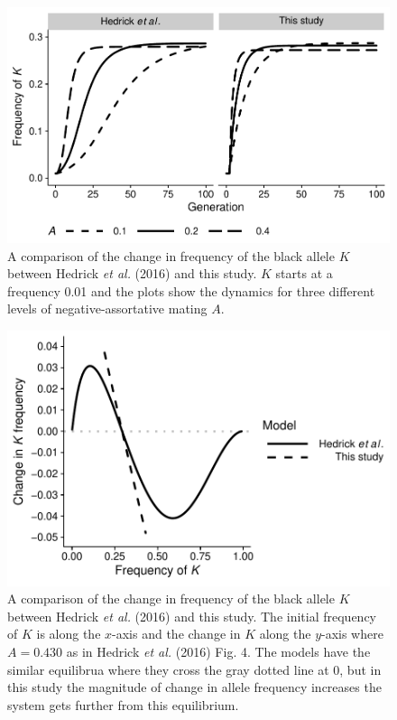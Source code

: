 \documentclass[
]{article}
\begin{document}
\begin{figure}[ht]
  \centering
  \includegraphics[width=\textwidth]{../figures/fig3.pdf}
  \caption{A comparison of the change in frequency of the black allele $K$ between Hedrick \textit{et al.} (2016) and this study. $K$ starts at a frequency 0.01 and the plots show the dynamics for three different levels of negative-assortative mating $A$.}
  \label{fig:fig3}
\end{figure}

\begin{figure}[ht]
  \centering
  \includegraphics[width=\textwidth]{../figures/fig4.pdf}
  \caption{A comparison of the change in frequency of the black allele $K$ between Hedrick \textit{et al.} (2016) and this study. The initial frequency of $K$ is along the $x$-axis and the change in $K$ along the $y$-axis where $A = 0.430$ as in Hedrick \textit{et al.} (2016) Fig. 4. The models have the similar equilibrua where they cross the gray dotted line at 0, but in this study the magnitude of change in allele frequency increases the system gets further from this equilibrium.}
  \label{fig:fig4}
\end{figure}
\end{document}
